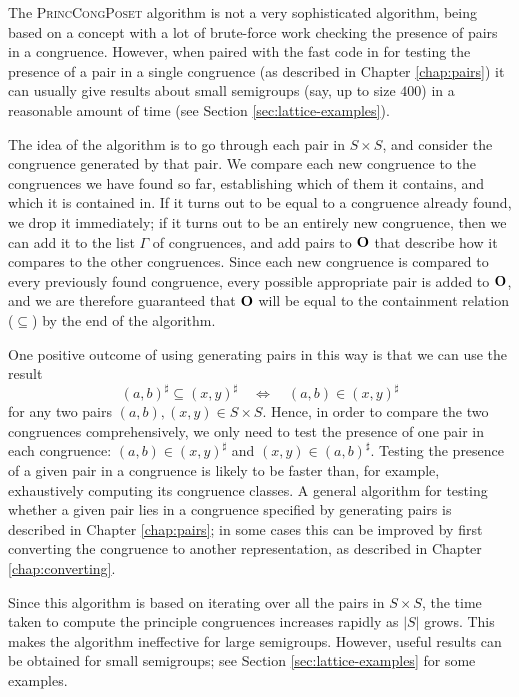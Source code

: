 The \textsc{PrincCongPoset} algorithm is not a very sophisticated algorithm,
being based on a concept with a lot of brute-force work checking the presence of
pairs in a congruence.  However, when paired with the fast code in
\libsemigroups{} \cite{libsemigroups} for testing the presence of a pair
in a single congruence (as described in Chapter \ref{chap:pairs}) it can usually
give results about small semigroups (say, up to size $400$) in a reasonable
amount of time (see Section \ref{sec:lattice-examples}).

The idea of the algorithm is to go through each pair in $S \times S$, and
consider the congruence generated by that pair.  We compare each new congruence
to the congruences we have found so far, establishing which of them it contains,
and which it is contained in.  If it turns out to be equal to a congruence
already found, we drop it immediately; if it turns out to be an entirely new
congruence, then we can add it to the list $\Gamma$ of congruences, and add
pairs to $\mathbf{O}$ that describe how it compares to the other congruences.  Since
each new congruence is compared to every previously found congruence, every
possible appropriate pair is added to $\mathbf{O}$, and we are therefore guaranteed
that $\mathbf{O}$ will be equal to the containment relation ($\subseteq$) by the end of
the algorithm.

One positive outcome of using generating pairs in this way is that we can use
the result
$$(a,b)^\sharp \subseteq (x,y)^\sharp \quad\iff\quad (a,b) \in (x,y)^\sharp$$
for any two pairs $(a,b), (x,y) \in S \times S$.  Hence, in order to compare the
two congruences comprehensively, we only need to test the presence of one pair
in each congruence: $(a,b) \in (x,y)^\sharp$ and $(x,y) \in (a,b)^\sharp$.
Testing the presence of a given pair in a congruence is likely to be faster
than, for example, exhaustively computing its congruence classes.  A general
algorithm for testing whether a given pair lies in a congruence specified by
generating pairs is described in Chapter \ref{chap:pairs}; in some cases this
can be improved by first converting the congruence to another representation, as
described in Chapter \ref{chap:converting}.

Since this algorithm is based on iterating over all the pairs in $S \times S$,
the time taken to compute the principle congruences increases rapidly as $|S|$
grows.  This makes the algorithm ineffective for large semigroups.  However,
useful results can be obtained for small semigroups; see Section
\ref{sec:lattice-examples} for some examples.

